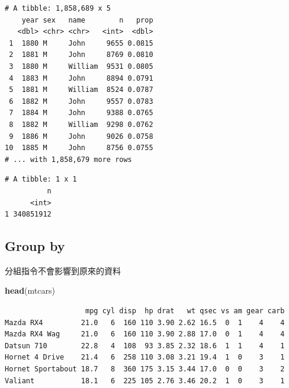 \documentclass[]{book}
\newenvironment{Shaded}{\begin{snugshade}}{\end{snugshade}}
\newcommand{\DataTypeTok}[1]{\textcolor[rgb]{0.13,0.29,0.53}{#1}}
\newcommand{\KeywordTok}[1]{\textcolor[rgb]{0.13,0.29,0.53}{\textbf{#1}}}
\newcommand{\NormalTok}[1]{#1}
\newcommand{\OperatorTok}[1]{\textcolor[rgb]{0.81,0.36,0.00}{\textbf{#1}}}
\newcommand{\StringTok}[1]{\textcolor[rgb]{0.31,0.60,0.02}{#1}}
\theoremstyle{definition}
\theoremstyle{definition}
\theoremstyle{definition}
\theoremstyle{remark}
\begin{document}
\begin{Shaded}
\end{Shaded}

\begin{verbatim}
# A tibble: 1,858,689 x 5
    year sex   name        n   prop
   <dbl> <chr> <chr>   <int>  <dbl>
 1  1880 M     John     9655 0.0815
 2  1881 M     John     8769 0.0810
 3  1880 M     William  9531 0.0805
 4  1883 M     John     8894 0.0791
 5  1881 M     William  8524 0.0787
 6  1882 M     John     9557 0.0783
 7  1884 M     John     9388 0.0765
 8  1882 M     William  9298 0.0762
 9  1886 M     John     9026 0.0758
10  1885 M     John     8756 0.0755
# ... with 1,858,679 more rows
\end{verbatim}

\begin{Shaded}
\end{Shaded}

\begin{verbatim}
# A tibble: 1 x 1
          n
      <int>
1 340851912
\end{verbatim}

\hypertarget{group-by}{%
\subsection{Group by}\label{group-by}}

分組指令不會影響到原來的資料

\begin{Shaded}
\begin{Highlighting}[]
\KeywordTok{head}\NormalTok{(mtcars)}
\end{Highlighting}
\end{Shaded}

\begin{verbatim}
                   mpg cyl disp  hp drat   wt qsec vs am gear carb
Mazda RX4         21.0   6  160 110 3.90 2.62 16.5  0  1    4    4
Mazda RX4 Wag     21.0   6  160 110 3.90 2.88 17.0  0  1    4    4
Datsun 710        22.8   4  108  93 3.85 2.32 18.6  1  1    4    1
Hornet 4 Drive    21.4   6  258 110 3.08 3.21 19.4  1  0    3    1
Hornet Sportabout 18.7   8  360 175 3.15 3.44 17.0  0  0    3    2
Valiant           18.1   6  225 105 2.76 3.46 20.2  1  0    3    1
\end{verbatim}
\end{document}
